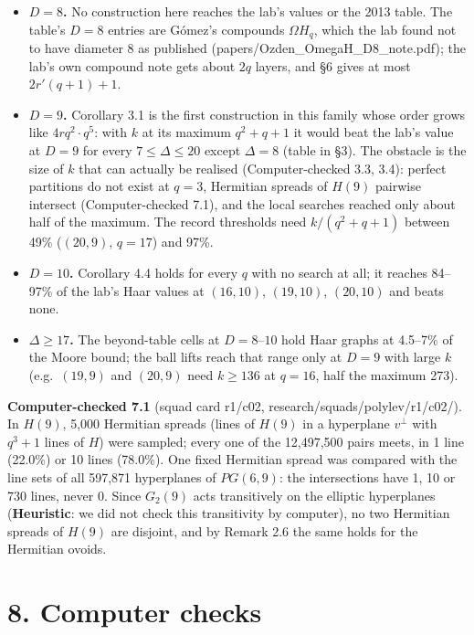 \documentclass[
  10pt,
]{article}
\providecommand{\tightlist}{%
  \setlength{\itemsep}{0pt}\setlength{\parskip}{0pt}}
\begin{document}
\begin{itemize}
\tightlist
\item
  \textbf{\(D = 8\).} No construction here reaches the lab's values or
  the 2013 table. The table's \(D=8\) entries are Gómez's compounds
  \(\Omega H_q\), which the lab found not to have diameter 8 as
  published (papers/Ozden\_OmegaH\_D8\_note.pdf); the lab's own compound
  note gets about \(2q\) layers, and §6 gives at most \(2r'(q+1)+1\).
\item
  \textbf{\(D = 9\).} Corollary 3.1 is the first construction in this
  family whose order grows like \(4rq^2\cdot q^5\): with \(k\) at its
  maximum \(q^2+q+1\) it would beat the lab's value at \(D = 9\) for
  every \(7\le\Delta\le 20\) except \(\Delta = 8\) (table in §3). The
  obstacle is the size of \(k\) that can actually be realised
  (Computer-checked 3.3, 3.4): perfect partitions do not exist at
  \(q = 3\), Hermitian spreads of \(H(9)\) pairwise intersect
  (Computer-checked 7.1), and the local searches reached only about half
  of the maximum. The record thresholds need \(k/(q^2+q+1)\) between
  49\% (\((20,9)\), \(q = 17\)) and 97\%.
\item
  \textbf{\(D = 10\).} Corollary 4.4 holds for every \(q\) with no
  search at all; it reaches 84--97\% of the lab's Haar values at
  \((16,10)\), \((19,10)\), \((20,10)\) and beats none.
\item
  \textbf{\(\Delta\ge 17\).} The beyond-table cells at \(D = 8\)--\(10\)
  hold Haar graphs at 4.5--7\% of the Moore bound; the ball lifts reach
  that range only at \(D = 9\) with large \(k\) (e.g.~\((19,9)\) and
  \((20,9)\) need \(k\ge 136\) at \(q = 16\), half the maximum 273).
\end{itemize}

\textbf{Computer-checked 7.1} (squad card r1/c02,
research/squads/polylev/r1/c02/). In \(H(9)\), 5,000 Hermitian spreads
(lines of \(H(9)\) in a hyperplane \(v^\perp\) with \(q^3+1\) lines of
\(H\)) were sampled; every one of the 12,497,500 pairs meets, in 1 line
(22.0\%) or 10 lines (78.0\%). One fixed Hermitian spread was compared
with the line sets of all 597,871 hyperplanes of \(PG(6,9)\): the
intersections have 1, 10 or 730 lines, never 0. Since \(G_2(9)\) acts
transitively on the elliptic hyperplanes (\textbf{Heuristic}: we did not
check this transitivity by computer), no two Hermitian spreads of
\(H(9)\) are disjoint, and by Remark 2.6 the same holds for the
Hermitian ovoids.

\hypertarget{computer-checks}{%
\section{8. Computer checks}\label{computer-checks}}
\end{document}
